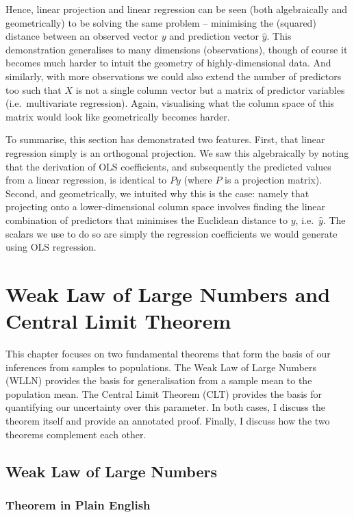 \documentclass[
]{book}
\begin{document}
Hence, linear projection and linear regression can be seen (both algebraically and geometrically) to be solving the same problem -- minimising the (squared) distance between an observed vector \(y\) and prediction vector \(\hat{y}\). This demonstration generalises to many dimensions (observations), though of course it becomes much harder to intuit the geometry of highly-dimensional data. And similarly, with more observations we could also extend the number of predictors too such that \(X\) is not a single column vector but a matrix of predictor variables (i.e.~multivariate regression). Again, visualising what the column space of this matrix would look like geometrically becomes harder.

To summarise, this section has demonstrated two features. First, that linear regression simply is an orthogonal projection. We saw this algebraically by noting that the derivation of OLS coefficients, and subsequently the predicted values from a linear regression, is identical to \(Py\) (where \(P\) is a projection matrix). Second, and geometrically, we intuited why this is the case: namely that projecting onto a lower-dimensional column space involves finding the linear combination of predictors that minimises the Euclidean distance to \(y\), i.e.~\(\hat{y}\). The scalars we use to do so are simply the regression coefficients we would generate using OLS regression.

\hypertarget{wlln}{%
\chapter{Weak Law of Large Numbers and Central Limit Theorem}\label{wlln}}

This chapter focuses on two fundamental theorems that form the basis of our inferences from samples to populations. The Weak Law of Large Numbers (WLLN) provides the basis for generalisation from a sample mean to the population mean. The Central Limit Theorem (CLT) provides the basis for quantifying our uncertainty over this parameter. In both cases, I discuss the theorem itself and provide an annotated proof. Finally, I discuss how the two theorems complement each other.

\hypertarget{weak-law-of-large-numbers}{%
\section{Weak Law of Large Numbers}\label{weak-law-of-large-numbers}}

\hypertarget{theorem-in-plain-english}{%
\subsection{Theorem in Plain English}\label{theorem-in-plain-english}}
\end{document}
